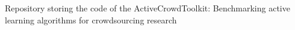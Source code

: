 Repository storing the code of the Active\+Crowd\+Toolkit\+: Benchmarking active learning algorithms for crowdsourcing research 